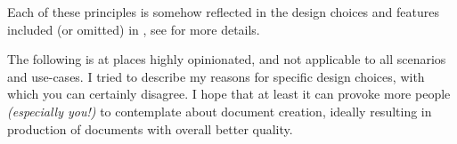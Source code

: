 Each of these principles is somehow reflected in the design choices and features included (or omitted) in \TeXsis{}, see  for more details.

\begin{remark}[Disclaimer]
    The following is at places highly opinionated, and not applicable to all scenarios and use-cases.
    I tried to describe my reasons for specific design choices, with which you can certainly disagree.
    I hope that at least it can provoke more people \emph{(especially you!)} to contemplate about document creation, ideally resulting in production of documents with overall better quality.
\end{remark}
